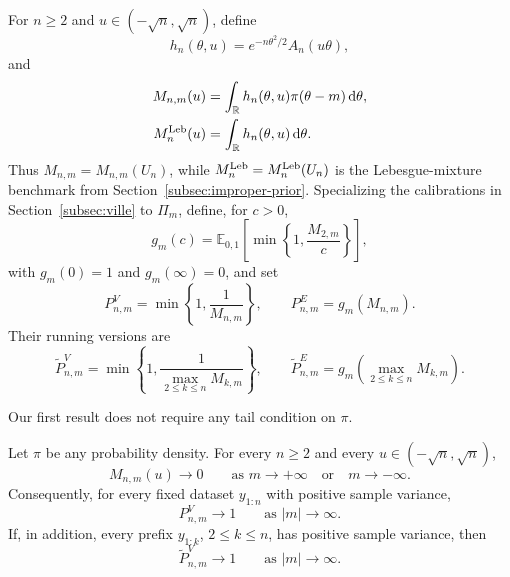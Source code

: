 For \(n\geq2\) and \(u\in(-\sqrt n,\sqrt n)\), define
\begin{equation}
\label{eq:hnu-def}
  h_n(\theta,u)
  =
  e^{-n\theta^2/2}A_n(u\theta),
\end{equation}
and
\allowdisplaybreaks
\begin{equation}
\label{eq:shifted-mixtures}
\begin{aligned}
  M_{n,m}(u)
  & =
  \int_{\mathbb R}
  h_n(\theta,u)\pi(\theta-m)\,\mathrm{d}\theta,
  \\
  M_n^{\mathrm{Leb}}(u)
  & =
  \int_{\mathbb R}h_n(\theta,u)\,\mathrm{d}\theta.
\end{aligned}
\end{equation}
Thus \(M_{n,m}=M_{n,m}(U_n)\), while
\(M_n^{\mathrm{Leb}}=M_n^{\mathrm{Leb}}(U_n)\) is the Lebesgue-mixture benchmark from
Section~\ref{subsec:improper-prior}.  Specializing the calibrations in
Section~\ref{subsec:ville} to \(\Pi_m\), define, for \(c>0\),
\begin{equation}
\label{eq:gm-def}
  g_m(c)
  =
  \mathbb E_{0,1}
  \left[
    \min\left\{1,\frac{M_{2,m}}{c}\right\}
  \right],
\end{equation}
with \(g_m(0)=1\) and \(g_m(\infty)=0\), and set
\begin{equation}
\label{eq:shifted-p-processes}
  P_{n,m}^V
  =
  \min\left\{1,\frac1{M_{n,m}}\right\},
  \qquad
  P_{n,m}^E
  =
  g_m(M_{n,m}).
\end{equation}
Their running versions are
\begin{equation}
\label{eq:shifted-running-p-processes}
  \widetilde P_{n,m}^V
  =
  \min\left\{
    1,
    \frac1{\max_{2\leq k\leq n}M_{k,m}}
  \right\},
  \qquad
  \widetilde P_{n,m}^E
  =
  g_m\!\left(\max_{2\leq k\leq n}M_{k,m}\right).
\end{equation}

Our first result does not require any tail condition on \(\pi\).

\begin{proposition}
\label{prop:ville-degeneracy}
Let \(\pi\) be any probability density.  For every \(n\geq2\) and
every \(u\in(-\sqrt n,\sqrt n)\),
\begin{equation}
\label{eq:Mnm-to-zero}
  M_{n,m}(u)
  \longrightarrow
  0
  \qquad\text{as }m\to+\infty
  \quad\text{or}\quad
  m\to-\infty.
\end{equation}
Consequently, for every fixed dataset \(y_{1:n}\) with positive sample
variance,
\begin{equation}
\label{eq:PV-to-one}
  P_{n,m}^V
  \longrightarrow
  1
  \qquad\text{as }|m|\to\infty.
\end{equation}
If, in addition, every prefix \(y_{1:k}\), \(2\leq k\leq n\), has
positive sample variance, then
\begin{equation}
\label{eq:running-PV-to-one}
  \widetilde P_{n,m}^V
  \longrightarrow
  1
  \qquad\text{as }|m|\to\infty.
\end{equation}
\end{proposition}

